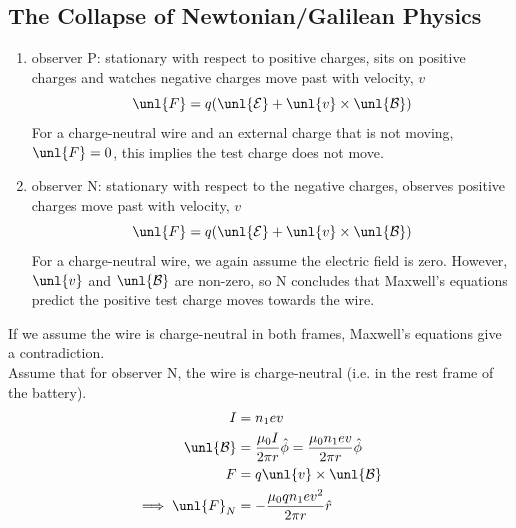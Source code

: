 \documentclass[a4paper, 11pt, normalem]{report}
\newcommand\E{\mathcal{E}}
\newcommand\uE{\unl{\E}}
\newcommand\B{\mathcal{B}}
\newcommand\uB{\unl{\B}}
\newcommand\hr{\hat{r}}
\begin{document}
\subsection{The Collapse of Newtonian/Galilean Physics}
\begin{enumerate}
    \item observer P: stationary with respect to positive charges, sits on positive charges and watches negative charges move past with velocity, $v$
    \begin{equation*}
        \unl{F} = q(\uE + \unl{v}\times\uB)
    \end{equation*}
    For a charge-neutral wire and an external charge that is not moving, $\unl{F} = 0$, this implies the test charge does not move.
    \item observer N: stationary with respect to the negative charges, observes positive charges move past with velocity, $v$
    \begin{equation*}
        \unl{F} = q(\uE + \unl{v}\times\uB)
    \end{equation*}
    For a charge-neutral wire, we again assume the electric field is zero.
    However, $\unl{v}$ and $\uB$ are non-zero, so N concludes that Maxwell's equations predict the positive test charge moves towards the wire.
\end{enumerate}
If we assume the wire is charge-neutral in both frames, Maxwell's equations give a contradiction. \\
Assume that for observer N, the wire is charge-neutral (i.e. in the rest frame of the battery).
\begin{align*}
    I &= n_1ev \\
    \uB &= \frac{\mu_0I}{2\pi r}\hat{\phi} = \frac{\mu_0 n_1ev}{2\pi r}\hat{\phi} \\
    F &= q\unl{v}\times\uB \\
    \implies \unl{F}_N &= -\frac{\mu_0 qn_1ev^2}{2\pi r}\hr
\end{align*}
\end{document}
